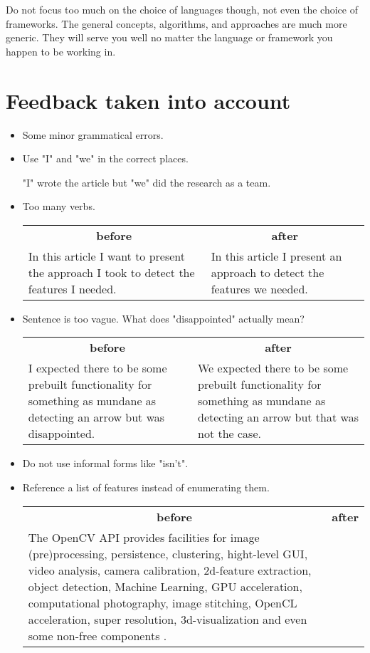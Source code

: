 \documentclass[12pt, a4paper]{article}
\begin{document}
Do not focus too much on the choice of languages though, not even the choice of frameworks. The general concepts, algorithms, and approaches are much more generic. They will serve you well no matter the language or framework you happen to be working in.

\printbibliography

\section{Feedback taken into account}
\begin{itemize}
	\item Some minor grammatical errors.
	\item Use "I" and "we" in the correct places.

	"I" wrote the article but "we" did the research as a team.
	\item Too many verbs.

	\begin{tabular}{p{.5\linewidth} p{.5\linewidth}}
		\multicolumn{1}{c}{\textbf{before}} & \multicolumn{1}{c}{\textbf{after}}\\
		In this article I want to present the approach I took to detect the features I needed.&
		In this article I present an approach to detect the features we needed.\\
	\end{tabular}

	\item Sentence is too vague. What does "disappointed" actually mean?

	\begin{tabular}{p{.5\linewidth} p{.5\linewidth}}
		\multicolumn{1}{c}{\textbf{before}} & \multicolumn{1}{c}{\textbf{after}}\\
		I expected there to be some prebuilt functionality for something as mundane as detecting an arrow but was disappointed.&
		We expected there to be some prebuilt functionality for something as mundane as detecting an arrow but that was not the case.\\
	\end{tabular}

	\item Do not use informal forms like "isn't".
	\item Reference a list of features instead of enumerating them.

	\begin{tabular}{p{.5\linewidth} p{.5\linewidth}}
		\multicolumn{1}{c}{\textbf{before}} & \multicolumn{1}{c}{\textbf{after}}\\
		The OpenCV API provides facilities for image (pre)processing, persistence, clustering, hight-level GUI, video analysis, camera calibration, 2d-feature extraction, object detection, Machine Learning, GPU acceleration, computational photography, image stitching, OpenCL acceleration, super resolution, 3d-visualization and even some non-free components \cite{openCVNonFree}.


\end{tabular}
\end{itemize}
\end{document}
